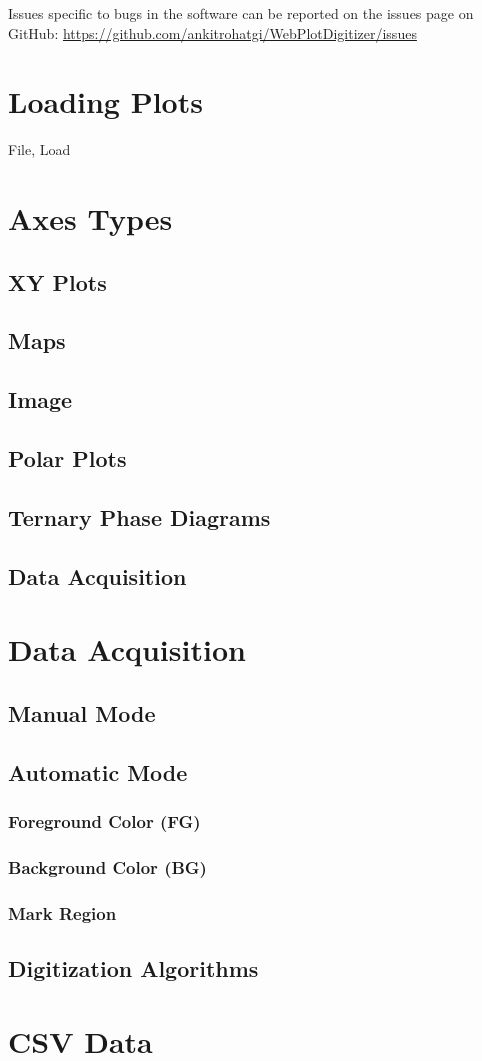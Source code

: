 \documentclass{article}
\begin{document}
Issues specific to bugs in the software can be reported on the issues page on GitHub: \url{https://github.com/ankitrohatgi/WebPlotDigitizer/issues}

\section{Loading Plots}
File, Load
\section{Axes Types}
\subsection{XY Plots}
\subsection{Maps}
\subsection{Image}
\subsection{Polar Plots}
\subsection{Ternary Phase Diagrams}
\subsection{Data Acquisition}
\section{Data Acquisition}
\subsection{Manual Mode}
\subsection{Automatic Mode}
\subsubsection{Foreground Color (FG)}
\subsubsection{Background Color (BG)}
\subsubsection{Mark Region}
\subsection{Digitization Algorithms}
\section{CSV Data}
\end{document}
